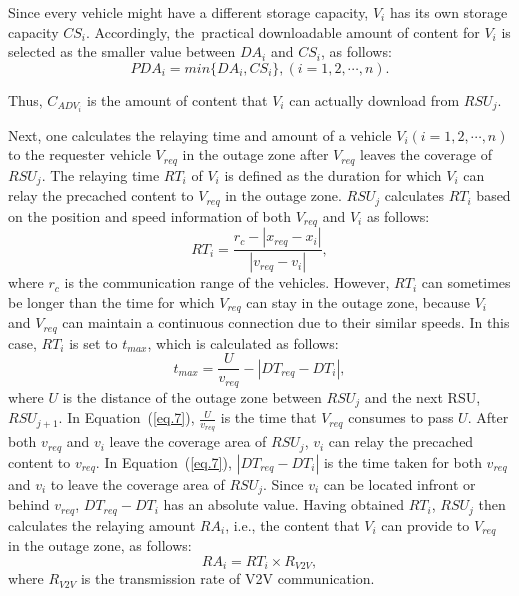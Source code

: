\documentclass[sensors,aricle,accept,pdftex,moreauthors]{Definitions/mdpi}
\begin{document}
Since every vehicle might have a different storage capacity, $V_{i}$ has its own storage capacity $CS_{i}$. Accordingly, the~practical downloadable amount of content for $V_{i}$ is selected as the smaller value between $DA_{i}$ and $CS_{i}$, as follows:
\begin{equation}
    PDA_{i} = min\{DA_{i}, CS_{i}\}, (i=1,2,\cdots,n). \label{eq.5}
\end{equation}

Thus, $C_{ADV_{i}}$ is the amount of content that $V_{i}$ can actually download from $RSU_{j}$.

Next, one calculates the relaying time and amount of a vehicle $V_{i} (i=1,2,\cdots,n)$ to the requester vehicle $V_{req}$ in the outage zone after $V_{req}$ leaves the coverage of $RSU_{j}$. 
The relaying time $RT_{i}$ of $V_{i}$ is defined as the duration for which $V_{i}$ can relay the precached content to $V_{req}$ in the outage zone. 
$RSU_{j}$ calculates $RT_{i}$ based on the position and speed information of both $V_{req}$ and $V_{i}$ as follows:
\begin{equation}
    RT_{i}=\frac{r_{c}-\left| x_{req}-x_{i}\right|}{\left| v_{req}-v_{i}\right|},
\end{equation}
where $r_{c}$ is the communication range of the vehicles. 
However, $RT_{i}$ can sometimes be longer than the time for which $V_{req}$ can stay in the outage zone, because $V_{i}$ and $V_{req}$ can maintain a continuous connection due to their similar speeds.
In this case, $RT_{i}$ is set to $t_{max}$, which is calculated as follows:
\begin{equation}
    t_{max}=\frac{U}{v_{req}}-|DT_{req}-DT_{i}|,\label{eq.7}
\end{equation}
where $U$ is the distance of the outage zone between $RSU_{j}$ and the next RSU, $RSU_{j+1}$.
In Equation~(\ref{eq.7}), $\frac{U}{v_{req}}$ is the time that $V_{req}$ consumes to pass $U$.
After both $v_{req}$ and $v_{i}$ leave the coverage area of $RSU_{j}$, $v_{i}$ can relay the precached content to $v_{req}$.
In Equation~(\ref{eq.7}), $|DT_{req}-DT_{i}|$ is the time taken 
for both $v_{req}$ and $v_{i}$ to leave the coverage area of $RSU_{j}$. 
Since $v_{i}$ can be located infront or behind $v_{req}$, $DT_{req}-DT_{i}$ has an absolute value. 
Having obtained $RT_{i}$, $RSU_{j}$ then calculates the relaying amount $RA_{i}$, i.e., the content that $V_{i}$ can provide to $V_{req}$ in the outage zone, as follows:
\begin{equation}
    RA_{i}=RT_{i} \times R_{V2V}, \label{eq.8}
\end{equation}
where $R_{V2V}$ is the transmission rate of {V2V} communication. 
\end{document}
